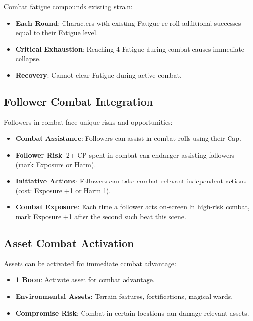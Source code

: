Combat fatigue compounds existing strain:

\begin{itemize}
    \item \textbf{Each Round}: Characters with existing Fatigue re-roll additional successes equal to their Fatigue level.
    \item \textbf{Critical Exhaustion}: Reaching 4 Fatigue during combat causes immediate collapse.
    \item \textbf{Recovery}: Cannot clear Fatigue during active combat.
\end{itemize}

\subsection*{Follower Combat Integration}

Followers in combat face unique risks and opportunities:

\begin{itemize}
    \item \textbf{Combat Assistance}: Followers can assist in combat rolls using their Cap.
    \item \textbf{Follower Risk}: 2+ CP spent in combat can endanger assisting followers (mark Exposure or Harm).
    \item \textbf{Initiative Actions}: Followers can take combat-relevant independent actions (cost: Exposure +1 or Harm 1).
    \item \textbf{Combat Exposure}: Each time a follower acts on-screen in high-risk combat, mark Exposure +1 after the second such beat this scene.
\end{itemize}

\subsection*{Asset Combat Activation}

Assets can be activated for immediate combat advantage:

\begin{itemize}
    \item \textbf{1 Boon}: Activate asset for combat advantage.
    \item \textbf{Environmental Assets}: Terrain features, fortifications, magical wards.
    \item \textbf{Compromise Risk}: Combat in certain locations can damage relevant assets.
\end{itemize}

